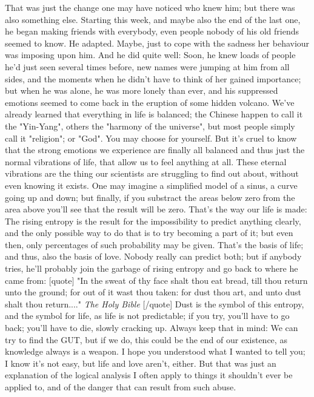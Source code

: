 That was just the change one may have noticed who knew him; but there was also something else. Starting this week, and maybe also the end of the last one, he began making friends with everybody, even people nobody of his old friends seemed to know. 
He adapted. 
Maybe, just to cope with the sadness her behaviour was imposing upon him. 
And he did quite well: Soon, he knew loads of people he'd just seen several times before, new names were jumping at him from all sides, and the moments when he didn't have to think of her gained importance; but when he was alone, he was more lonely than ever, and his suppressed emotions seemed to come back in the eruption of some hidden volcano. 
We've already learned that everything in life is balanced; the Chinese happen to call it the "Yin-Yang", others the "harmony of the universe", but most people simply call it "religion"; or "God". 
You may choose for yourself. 
But it's cruel to know that the strong emotions we experience are finally all balanced and thus just the normal vibrations of life, that allow us to feel anything at all. 
These eternal vibrations are the thing our scientists are struggling to find out about, without even knowing it exists. 
One may imagine a simplified model of a sinus, a curve going up and down; but finally, if you substract the areas below zero from the area above you'll see that the result will be zero. That's the way our life is made: The rising entropy is the result for the impossibility to predict anything clearly, and the only possible way to do that is to try becoming a part of it; but even then, only percentages of such probability may be given. 
That's the basis of life; and thus, also the basis of love. 
Nobody really can predict both; but if anybody tries, he'll probably join the garbage of rising entropy and go back to where he came from:
[quote]
"In the sweat of thy face shalt thou eat bread, till thou return unto the ground; for out of it wast thou taken: for dust thou art, and unto dust shalt thou return...."
\emph{The Holy Bible}
[/quote]
Dust is the symbol of this entropy, and the symbol for life, as life is not predictable; if you try, you'll have to go back; you'll have to die, slowly cracking up. 
Always keep that in mind: We can try to find the GUT, but if we do, this could be the end of our existence, as knowledge always is a weapon. 
I hope you understood what I wanted to tell you; I know it's not easy, but life and love aren't, either. 
But that was just an explanation of the logical analysis I often apply to things it shouldn't ever be applied to, and of the danger that can result from such abuse. 
